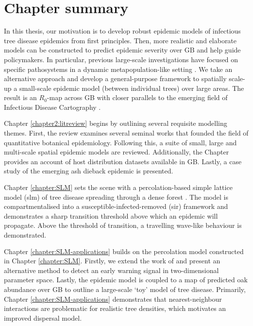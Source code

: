 \newpage

\section{Chapter summary}

In this thesis, our motivation is to develop robust epidemic models of infectious tree disease
epidemics from first principles. Then, more realistic and elaborate models can be constructed to
predict epidemic severity over GB and help guide policymakers. 
In particular, previous large-scale investigations
have focused on specific pathosystems in a dynamic metapopulation-like setting
\cite{large-scale-control, meentemeyer2011epidemiological, harwood2009epidemiological}. We take
an alternative approach and develop a general-purpose framework to spatially scale-up a small-scale epidemic
model (between individual trees) over large areas. The result is an $R_0$-map across GB with closer parallels
to the emerging field of Infectious Disease Cartography \cite{otieno2021modeling, KRAEMER201619, messina2016mapping}.

Chapter \ref{chapter2:litreview} begins by outlining several requisite modelling themes. First, the review examines
several seminal works that founded the field of quantitative botanical epidemiology. Following this,
a suite of small, large and multi-scale spatial epidemic models are reviewed. Additionally,
the Chapter provides an account of host distribution datasets available in GB. Lastly, a case study of the emerging
ash dieback epidemic is presented.

Chapter \ref{chapter:SLM} sets the scene with a percolation-based simple lattice model (\acrshort{slm}) of tree
disease spreading through a dense forest \cite{OROZCOFUENTES201912}. The model is compartmentalised
into a susceptible-infected-removed (\acrshort{sir}) framework and demonstrates a sharp transition threshold above which an epidemic will propagate. 
Above the threshold of transition, a travelling wave-like behaviour is demonstrated.

Chapter \ref{chapter:SLM-applications} builds on the percolation model constructed in Chapter \ref{chapter:SLM}.
Firstly, we extend the work of \cite{OROZCOFUENTES201912} and present an alternative method to detect an early
warning signal in two-dimensional parameter space. Lastly, the epidemic model is coupled to a map of predicted
oak abundance over GB \cite{hill.data} to outline a large-scale `toy' model of tree disease. 
Primarily, Chapter \ref{chapter:SLM-applications} demonstrates that nearest-neighbour interactions are problematic
for realistic tree densities, which motivates an improved dispersal model. 

